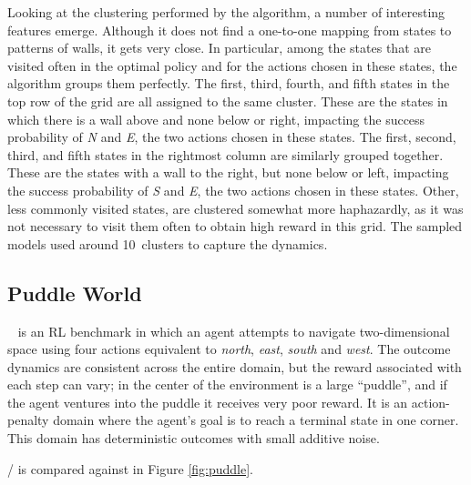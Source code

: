 Looking at the clustering performed by the algorithm, a number of
interesting features emerge.  Although it does not find a one-to-one
mapping from states to patterns of walls, it gets very close.  In
particular, among the states that are visited often in the optimal
policy and for the actions chosen in these states, the algorithm
groups them perfectly.  The first, third, fourth, and fifth states in
the top row of the grid are all assigned to the same cluster.  These
are the states in which there is a wall above and none below or right,
impacting the success probability of \emph{N} and \emph{E}, the two actions
chosen in these states.  The first, second, third, and fifth states in
the rightmost column are similarly grouped together.  These are the
states with a wall to the right, but none below or left, impacting the
success probability of \emph{S} and \emph{E}, the two actions chosen in these
states.  Other, less commonly visited states, are clustered somewhat
more haphazardly,
as it was not necessary to visit them often to
obtain high reward in this grid.  The sampled models used around
10~clusters to capture the dynamics.

\subsection{Puddle World}
\label{puddle}

~\cite{boyan94b} is an RL benchmark in which an agent attempts to navigate two-dimensional space using four actions equivalent to \emph{north}, \emph{east}, \emph{south} and \emph{west}. The outcome dynamics are consistent across the entire domain, but the reward associated with each step can vary; in the center of the environment is a large ``puddle'', and if the agent ventures into the puddle it receives very poor reward. It is an action-penalty domain where the agent's goal is to reach a terminal state in one corner. This domain has deterministic outcomes with small additive noise.

/ is compared against  in Figure \ref{fig:puddle}.

